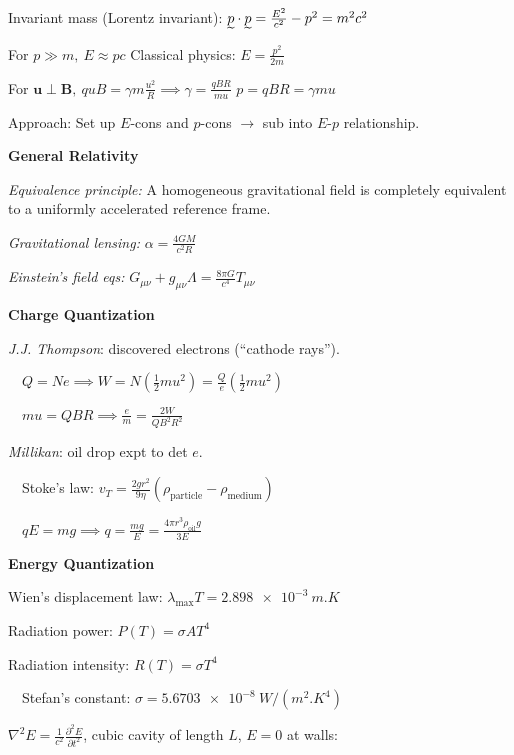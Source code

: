 \documentclass[twocolumn]{article}
\begin{document}
Invariant mass (Lorentz invariant): $\undertilde{p} \cdot \undertilde{p} = \frac{E^2}{c^2} - p^2 = m^2 c^2$


\cleardoublepage


For $p \gg m,\ E \approx pc$ \hfill Classical physics: $E = \frac{p^2}{2m}$

For $\mathbf{u} \perp \mathbf{B},\ quB = \gamma m \frac{u^2}{R} \implies \gamma = \frac{qBR}{mu}$ \hfill $p = q B R = \gamma m u$

Approach: Set up $E$-cons and $p$-cons $\to$ sub into $E$-$p$ relationship.

\vspace{-.5em}
\dotfill

\textbf{General Relativity}

\textit{Equivalence principle:} A homogeneous gravitational field is completely equivalent to a uniformly accelerated reference frame.

\textit{Gravitational lensing:} $\alpha = \frac{4GM}{c^2 R}$

\textit{Einstein's field eqs:} $G_{\mu \nu} + g_{\mu \nu} \Lambda = \frac{8 \pi G}{c^4} T_{\mu \nu}$

\dotfill

\textbf{Charge Quantization}

\textit{J.J. Thompson}: discovered electrons (``cathode rays'').

$\quad Q = Ne \implies W = N \left( \frac{1}{2} mu^2 \right) = \frac{Q}{e} \left( \frac{1}{2} mu^2 \right)$

$\quad mu = QBR \implies \frac{e}{m} = \frac{2W}{QB^2R^2}$

\textit{Millikan}: oil drop expt to det $e$.

$\quad$Stoke's law: $v_T = \frac{2gr^2}{9 \eta} (\rho_{\text{particle}} - \rho_{\text{medium}})$

$\quad qE = mg \implies q = \frac{mg}{E} = \frac{4 \pi r^3 \rho_{\text{oil}} g}{3E}$

\dotfill

\textbf{Energy Quantization}

Wien's displacement law: $\lambda_{\text{max}} T = \SI{2.898e-3}{m.K}$

Radiation power: $P(T) = \sigma A T^4$

Radiation intensity: $R(T) = \sigma T^4$

$\quad$Stefan's constant: $\sigma = \SI{5.6703e-8}{W/(m^2.K^4)}$

$\nabla^2 E = \frac{1}{c^2} \frac{\partial^2 E}{\partial t^2}$, cubic cavity of length $L$, $E=0$ at walls:
\end{document}
